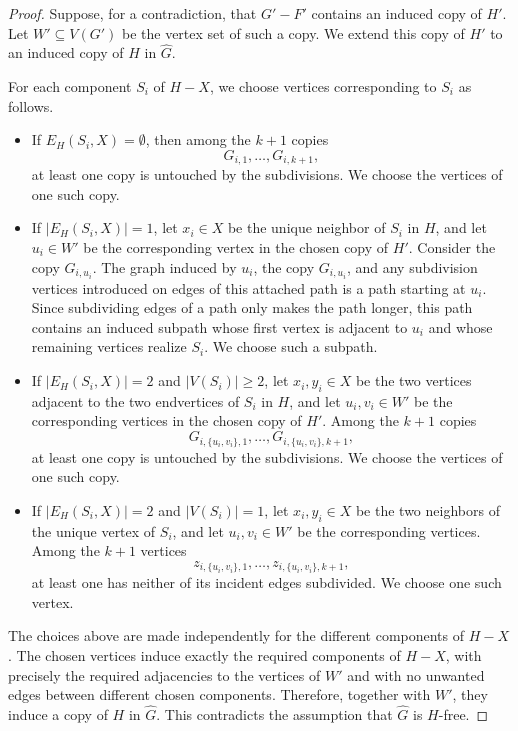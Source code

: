 \documentclass[a4paper,UKenglish,cleveref, autoref, thm-restate]{lipics-v2021}
\begin{document}
\begin{proof}
Suppose, for a contradiction, that $G'-F'$ contains an induced copy of $H'$.
Let $W'\subseteq V(G')$ be the vertex set of such a copy.
We extend this copy of $H'$ to an induced copy of $H$ in $\widehat{G}$.

For each component $S_i$ of $H-X$, we choose vertices corresponding to $S_i$ as
follows.

\begin{itemize}
    \item If $E_H(S_i,X)=\emptyset$, then among the $k+1$ copies
    \[
        G_{i,1},\ldots,G_{i,k+1},
    \]
    at least one copy is untouched by the subdivisions.
    We choose the vertices of one such copy.

    \item If $|E_H(S_i,X)|=1$, let $x_i\in X$ be the unique neighbor of $S_i$ in
    $H$, and let $u_i\in W'$ be the corresponding vertex in the chosen copy of
    $H'$.
    Consider the copy $G_{i,u_i}$.
    The graph induced by $u_i$, the copy $G_{i,u_i}$, and any subdivision
    vertices introduced on edges of this attached path is a path starting at
    $u_i$.
    Since subdividing edges of a path only makes the path longer, this path
    contains an induced subpath whose first vertex is adjacent to $u_i$ and
    whose remaining vertices realize $S_i$.
    We choose such a subpath.

    \item If $|E_H(S_i,X)|=2$ and $|V(S_i)|\geq 2$, let $x_i,y_i\in X$ be the
    two vertices adjacent to the two endvertices of $S_i$ in $H$, and let
    $u_i,v_i\in W'$ be the corresponding vertices in the chosen copy of $H'$.
    Among the $k+1$ copies
    \[
        G_{i,\{u_i,v_i\},1},\ldots,G_{i,\{u_i,v_i\},k+1},
    \]
    at least one copy is untouched by the subdivisions.
    We choose the vertices of one such copy.

    \item If $|E_H(S_i,X)|=2$ and $|V(S_i)|=1$, let $x_i,y_i\in X$ be the two
    neighbors of the unique vertex of $S_i$, and let $u_i,v_i\in W'$ be the
    corresponding vertices.
    Among the $k+1$ vertices
    \[
        z_{i,\{u_i,v_i\},1},\ldots,z_{i,\{u_i,v_i\},k+1},
    \]
    at least one has neither of its incident edges subdivided.
    We choose one such vertex.
\end{itemize}

The choices above are made independently for the different components of
$H-X$.
The chosen vertices induce exactly the required components of $H-X$, with
precisely the required adjacencies to the vertices of $W'$ and with no unwanted
edges between different chosen components.
Therefore, together with $W'$, they induce a copy of $H$ in $\widehat{G}$.
This contradicts the assumption that $\widehat{G}$ is $H$-free.


\end{proof}
\end{document}
